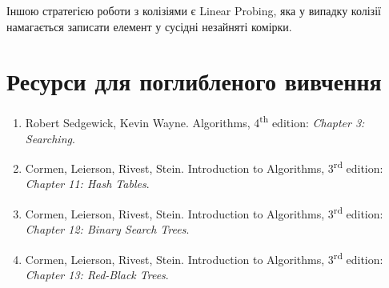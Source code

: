 \documentclass[12pt,a4paper]{report}
\begin{document}
Іншою стратегією роботи з колізіями є Linear Probing, яка у випадку колізії намагається записати елемент у сусідні незайняті комірки.



\section*{Ресурси для поглибленого вивчення}
\begin{enumerate}
    \item Robert Sedgewick, Kevin Wayne. Algorithms, 4\textsuperscript{th} edition: {\itshape Chapter 3: Searching}.
    \item Cormen, Leierson, Rivest, Stein. Introduction to Algorithms, 3\textsuperscript{rd} edition: {\itshape Chapter 11: Hash Tables}.
    \item Cormen, Leierson, Rivest, Stein. Introduction to Algorithms, 3\textsuperscript{rd} edition: {\itshape Chapter 12: Binary Search Trees}.
    \item Cormen, Leierson, Rivest, Stein. Introduction to Algorithms, 3\textsuperscript{rd} edition: {\itshape Chapter 13: Red-Black Trees}.
\end{enumerate}
\end{document}

